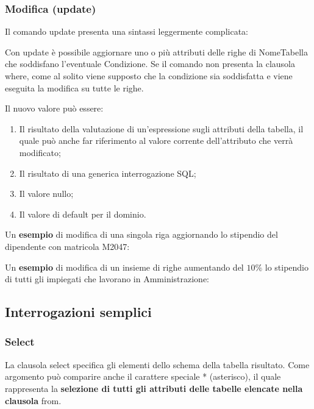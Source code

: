 \documentclass[a4paper]{article}
\begin{document}
	\subsubsection{Modifica (\textsf{update})}
	
	Il comando \textsf{update} presenta una sintassi leggermente complicata:
	
	Con \textsf{update} è possibile aggiornare uno o più attributi delle righe di \textsf{NomeTabella} che soddisfano l'eventuale \textsf{Condizione}. Se il comando non presenta la clausola \textsf{where}, come al solito viene supposto che la condizione sia soddisfatta e viene eseguita la modifica su tutte le righe.\newline
	
	\noindent
	Il nuovo valore può essere:
	\begin{enumerate}
		\item Il risultato della valutazione di un'espressione sugli attributi della tabella, il quale può anche far riferimento al valore corrente dell'attributo che verrà modificato;
		
		\item Il risultato di una generica interrogazione SQL;
		
		\item Il valore nullo;
		
		\item Il valore di default per il dominio.
	\end{enumerate}
	Un \textcolor{Green4}{\textbf{esempio}} di modifica di una singola riga aggiornando lo stipendio del dipendente con matricola \textsf{M2047}:
		
	Un \textcolor{Green4}{\textbf{esempio}} di modifica di un insieme di righe aumentando del $10\%$ lo stipendio di tutti gli impiegati che lavorano in Amministrazione:
	\newpage
	
	\subsection{Interrogazioni semplici}
	
	\subsubsection{\textsf{Select}}\label{par: select}
	
	La clausola \textsf{select} specifica gli elementi dello schema della tabella risultato. Come argomento può comparire anche il carattere speciale * (asterisco), il quale rappresenta la \textbf{selezione di tutti gli attributi delle tabelle elencate nella clausola} \textsf{from}.\newline
\end{document}
